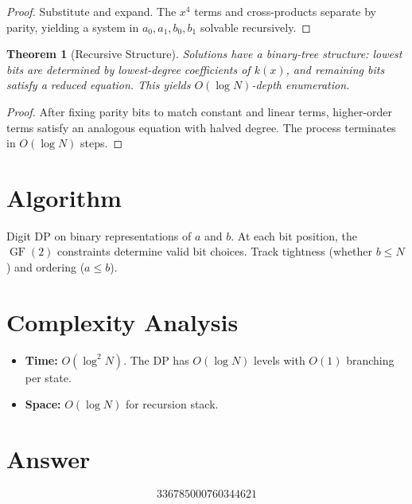 \documentclass[11pt]{article}
\newtheorem{theorem}{Theorem}
\begin{document}
\begin{proof}
Substitute and expand. The $x^4$ terms and cross-products separate by parity, yielding a system in $a_0, a_1, b_0, b_1$ solvable recursively.
\end{proof}

\begin{theorem}[Recursive Structure]
Solutions have a binary-tree structure: lowest bits are determined by lowest-degree coefficients of $k(x)$, and remaining bits satisfy a reduced equation. This yields $O(\log N)$-depth enumeration.
\end{theorem}

\begin{proof}
After fixing parity bits to match constant and linear terms, higher-order terms satisfy an analogous equation with halved degree. The process terminates in $O(\log N)$ steps.
\end{proof}

\section{Algorithm}

Digit DP on binary representations of $a$ and $b$. At each bit position, the $\operatorname{GF}(2)$ constraints determine valid bit choices. Track tightness (whether $b \le N$) and ordering ($a \le b$).

\section{Complexity Analysis}

\begin{itemize}
\item \textbf{Time:} $O(\log^2 N)$. The DP has $O(\log N)$ levels with $O(1)$ branching per state.
\item \textbf{Space:} $O(\log N)$ for recursion stack.
\end{itemize}

\section{Answer}

\[
\boxed{336785000760344621}
\]
\end{document}
